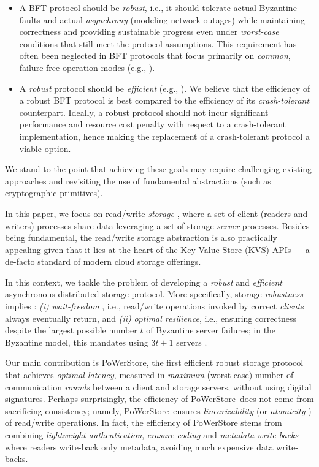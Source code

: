\documentclass[10pt,conference,compsocconf]{IEEEtran}
\newcommand{\protocol}{PoWerStore}
\begin{document}
\begin{itemize}
\item A BFT protocol should be \emph{robust}, i.e., it should tolerate actual Byzantine faults and  actual \emph{asynchrony} (modeling network outages) while maintaining correctness and providing sustainable progress even under \emph{worst-case} conditions that still meet the protocol assumptions. This requirement has often been neglected in BFT protocols that focus primarily on \emph{common}, failure-free operation modes (e.g., \cite{HendricksGR07,KotlaADCW09,GV10}).

\item A \emph{robust} protocol should be \emph{efficient} (e.g., \cite{GarciaRP11, VeroneseCBLV13}). We believe that the efficiency of a robust BFT protocol is best compared to the efficiency of its \emph{crash-tolerant} counterpart. Ideally, a robust protocol should not incur significant performance and resource cost penalty with respect to a crash-tolerant implementation, hence making the replacement of a crash-tolerant protocol a viable option.
\end{itemize}

We stand to the point that achieving these goals may require challenging existing approaches and revisiting the use of fundamental abstractions (such as cryptographic primitives).

In this paper, we focus on read/write \emph{storage} \cite{Lam86}, where a set of client (readers and writers) processes share data leveraging a set of storage
\emph{server} processes. Besides being fundamental, the read/write storage abstraction is also practically appealing given that it lies at the heart of the Key-Value Store (KVS) APIs --- a de-facto standard of modern cloud storage offerings.

In this context, we tackle the problem of developing a \emph{robust} and \emph{efficient} asynchronous distributed storage protocol. More specifically, storage \emph{robustness} implies \cite{ABND95}: \emph{(i)} \emph{wait-freedom} \cite{Her91}, i.e., read/write operations invoked by correct \emph{clients} always eventually return,
and \emph{(ii)} \emph{optimal resilience}, i.e., ensuring correctness despite the largest possible number $t$ of Byzantine server  failures; in the Byzantine model, this mandates using $3t+1$ servers \cite{MAD02}.


Our main contribution is \protocol, the first efficient robust storage protocol that
achieves \emph{optimal latency}, measured in \emph{maximum} (worst-case) number of communication \emph{rounds} between a client and storage servers, without using digital signatures. Perhaps surprisingly, the efficiency of \protocol\ does not come from sacrificing consistency; namely, \protocol\ ensures \emph{linearizability} \cite{HW90} (or \emph{atomicity} \cite{Lam86}) of read/write operations. In fact, the efficiency of \protocol{} stems from combining \emph{lightweight
authentication}, \emph{erasure coding} and \emph{metadata write-backs}
where readers write-back only metadata, avoiding much expensive data write-backs.
\end{document}
